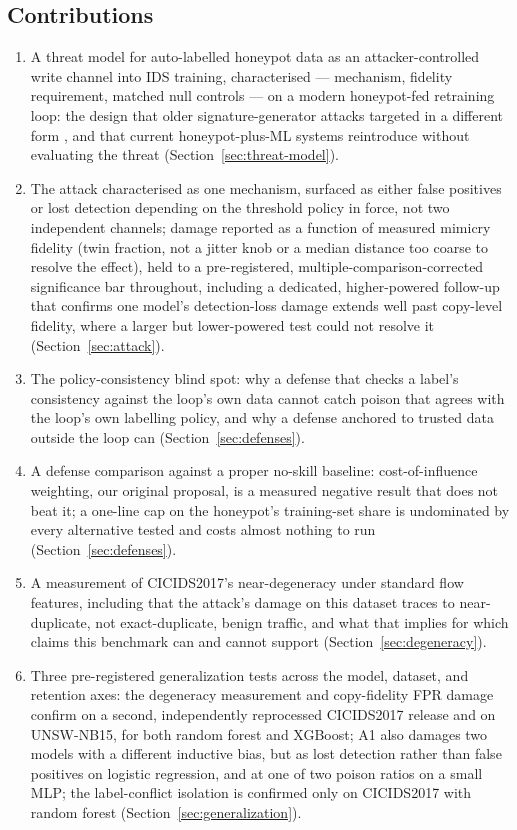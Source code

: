 \subsection*{Contributions}
\begin{enumerate}
  \item A threat model for auto-labelled honeypot data as an attacker-controlled write channel
    into IDS training, characterised — mechanism, fidelity requirement, matched null controls —
    on a modern honeypot-fed retraining loop: the design that older signature-generator attacks
    targeted in a different form \cite{newsome2006paragraph,perdisci2006misleading}, and that
    current honeypot-plus-ML systems reintroduce without evaluating the threat
    (Section~\ref{sec:threat-model}).
  \item The attack characterised as one mechanism, surfaced as either false positives or lost
    detection depending on the threshold policy in force, not two independent channels; damage
    reported as a function of measured mimicry fidelity (twin fraction, not a jitter knob or a
    median distance too coarse to resolve the effect), held to a pre-registered,
    multiple-comparison-corrected significance bar throughout, including a dedicated,
    higher-powered follow-up that confirms one model's detection-loss damage extends well past
    copy-level fidelity, where a larger but lower-powered test could not resolve it
    (Section~\ref{sec:attack}).
  \item The policy-consistency blind spot: why a defense that checks a label's consistency
    against the loop's own data cannot catch poison that agrees with the loop's own labelling
    policy, and why a defense anchored to trusted data outside the loop can
    (Section~\ref{sec:defenses}).
  \item A defense comparison against a proper no-skill baseline: cost-of-influence weighting, our
    original proposal, is a measured negative result that does not beat it; a one-line cap on the
    honeypot's training-set share is undominated by every alternative tested and costs almost
    nothing to run (Section~\ref{sec:defenses}).
  \item A measurement of CICIDS2017's near-degeneracy under standard flow features, including
    that the attack's damage on this dataset traces to near-duplicate, not exact-duplicate,
    benign traffic, and what that implies for which claims this benchmark can and cannot support
    (Section~\ref{sec:degeneracy}).
  \item Three pre-registered generalization tests across the model, dataset, and retention axes:
    the degeneracy measurement and copy-fidelity FPR damage confirm on a second, independently
    reprocessed CICIDS2017 release and on UNSW-NB15, for both random forest and XGBoost; A1 also
    damages two models with a different inductive bias, but as lost detection rather than false
    positives on logistic regression, and at one of two poison ratios on a small MLP; the
    label-conflict isolation is confirmed only on CICIDS2017 with random forest
    (Section~\ref{sec:generalization}).
\end{enumerate}

